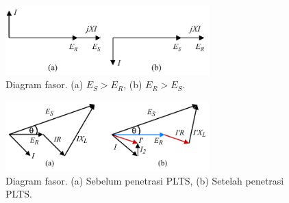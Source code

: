 {\begin{figure}[!h]
	\centering
	\includegraphics[width=0.7\textwidth]{Fig/volrise2.pdf}
	\caption{Diagram fasor. (a) $E_S>E_R$, (b) $E_R>E_S$.}
	\label{volrise2}
\end{figure}

\begin{figure}[!h]
	\centering
	\includegraphics[width=0.7\textwidth]{Fig/volrise3.pdf}
	\caption{Diagram fasor. (a) Sebelum penetrasi PLTS, (b) Setelah penetrasi PLTS.}
	\label{volrise3}
\end{figure}

}

